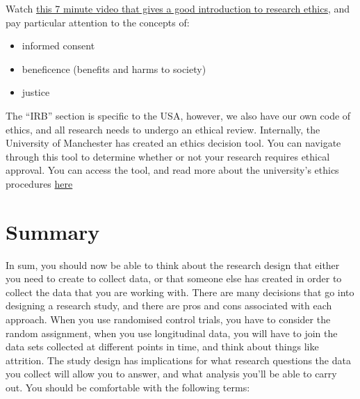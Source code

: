 \documentclass[]{book}
\providecommand{\tightlist}{%
  \setlength{\itemsep}{0pt}\setlength{\parskip}{0pt}}
\theoremstyle{definition}
\theoremstyle{definition}
\theoremstyle{definition}
\theoremstyle{remark}
\begin{document}
Watch \href{https://www.youtube.com/watch?v=Zbi7nIbAuMQ}{this 7 minute
video that gives a good introduction to research ethics}, and pay
particular attention to the concepts of:

\begin{itemize}
\tightlist
\item
  informed consent
\item
  beneficence (benefits and harms to society)
\item
  justice
\end{itemize}

The ``IRB'' section is specific to the USA, however, we also have our
own code of ethics, and all research needs to undergo an ethical review.
Internally, the University of Manchester has created an ethics decision
tool. You can navigate through this tool to determine whether or not
your research requires ethical approval. You can access the tool, and
read more about the university's ethics procedures
\href{https://www.manchester.ac.uk/research/environment/governance/ethics/}{here}

\hypertarget{summary-4}{%
\section{Summary}\label{summary-4}}

In sum, you should now be able to think about the research design that
either you need to create to collect data, or that someone else has
created in order to collect the data that you are working with. There
are many decisions that go into designing a research study, and there
are pros and cons associated with each approach. When you use randomised
control trials, you have to consider the random assignment, when you use
longitudinal data, you will have to join the data sets collected at
different points in time, and think about things like attrition. The
study design has implications for what research questions the data you
collect will allow you to answer, and what analysis you'll be able to
carry out. You should be comfortable with the following terms:
\end{document}
